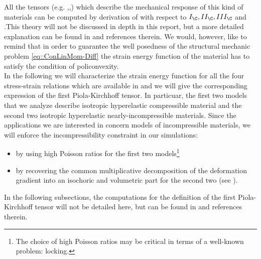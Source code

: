 All the tensors (e.g. \F,\T,\Piola) which describe the mechanical response of this kind of materials can be computed by derivation of \W with respect to $I_{\C},II_{\C},III_{\C}$ and \C.This theory will not be discussed in depth in this report, but a more detailed explanation can be found in \cite{GM,Deluca} and references therein. We would, however, like to remind that in order to guarantee the well posedness of the structural mechanic problem \eqref{eq::ConLinMom-Diff} the strain energy function \W of the material has to satisfy the condition of policonvexity.\\
In the following we will characterize the strain energy function for all the four stress-strain relations which are available in \LV and we will give the corresponding expression of the first Piola-Kirchhoff tensor. In particuar, the first two models that we analyze describe isotropic hyperelastic compressible material and the second two isotropic hyperelastic nearly-incompressible materials. Since the applications we are interested in concern models of incompressible materials, we will enforce the incompressibility constraint in our simulations:
\begin{itemize}
  \item by using high Poisson ratios for the first two models\footnote{The choice of high Poisson ratios may be critical in terms of a well-known problem: locking.}
  \item by recovering the common multiplicative decomposition of the deformation gradient \F into an isochoric and volumetric part for the second two (see \cite{BonetWood}).
\end{itemize}
In the following subsections, the computations for the definition of the first Piola-Kirchhoff tensor will not be detailed here, but can be found in \cite{Deluca} and references therein.

